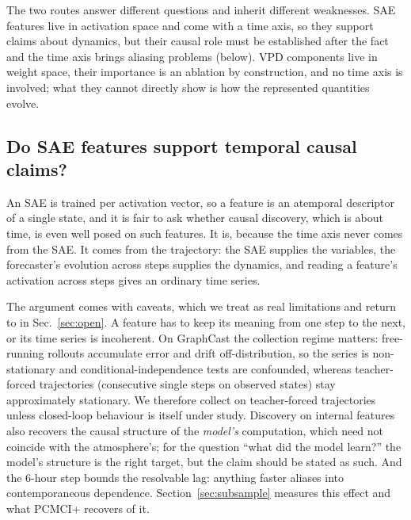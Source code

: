 The two routes answer different questions and inherit different weaknesses. SAE
features live in activation space and come with a time axis, so they support
claims about dynamics, but their causal role must be established after the fact
and the time axis brings aliasing problems (below). VPD components live in weight
space, their importance is an ablation by construction, and no time axis is
involved; what they cannot directly show is how the represented quantities evolve.

\subsection{Do SAE features support temporal causal claims?}
\label{sec:temporal}

An SAE is trained per activation vector, so a feature is an atemporal descriptor
of a single state, and it is fair to ask whether causal discovery, which is about
time, is even well posed on such features. It is, because the time axis never
comes from the SAE. It comes from the trajectory: the SAE supplies the variables,
the forecaster's evolution across steps supplies the dynamics, and reading a
feature's activation across steps gives an ordinary time series.

The argument comes with caveats, which we treat as real limitations and return to
in Sec.~\ref{sec:open}. A feature has to keep its meaning from one step to the
next, or its time series is incoherent. On GraphCast the collection regime
matters: free-running rollouts accumulate error and drift off-distribution, so the
series is non-stationary and conditional-independence tests are confounded,
whereas teacher-forced trajectories (consecutive single steps on observed states)
stay approximately stationary. We therefore collect on teacher-forced trajectories
unless closed-loop behaviour is itself under study. Discovery on internal features
also recovers the causal structure of the \emph{model's} computation, which need
not coincide with the atmosphere's; for the question ``what did the model learn?''
the model's structure is the right target, but the claim should be stated as such.
And the 6-hour step bounds the resolvable lag: anything faster aliases into
contemporaneous dependence. Section~\ref{sec:subsample} measures this effect and
what PCMCI+ recovers of it.
